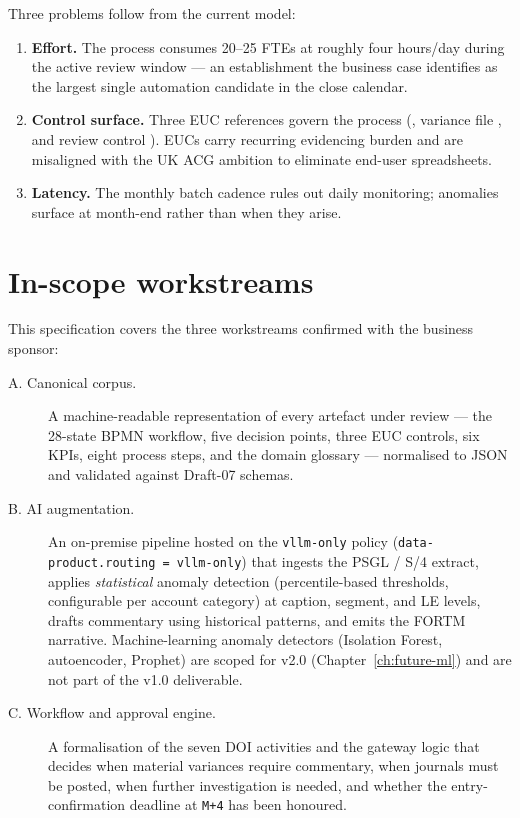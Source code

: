 \documentclass[11pt,a4paper,twoside]{report}
\begin{document}
Three problems follow from the current model:

\begin{enumerate}
\item \textbf{Effort.} The process consumes 20--25 FTEs at roughly
four hours/day during the active review window --- an
establishment the business case identifies as the largest
single automation candidate in the close calendar.
\item \textbf{Control surface.} Three EUC references govern the
process (, variance file
, and review control
). EUCs carry recurring
evidencing burden and are misaligned with the UK ACG ambition
to eliminate end-user spreadsheets.
\item \textbf{Latency.} The monthly batch cadence rules out daily
monitoring; anomalies surface at month-end rather than when
they arise.
\end{enumerate}

\section{In-scope workstreams}

This specification covers the three workstreams confirmed with the
business sponsor:

\begin{description}
\item[A. Canonical corpus.] A machine-readable representation of
every artefact under review --- the 28-state BPMN workflow,
five decision points, three EUC controls, six KPIs, eight
process steps, and the domain glossary --- normalised to JSON
and validated against Draft-07 schemas.
\item[B. AI augmentation.] An on-premise pipeline hosted on the
\texttt{vllm-only} policy (\texttt{data-product.routing = vllm-only})
that ingests the PSGL / S/4 extract, applies
\emph{statistical} anomaly detection (percentile-based
thresholds, configurable per account category) at caption,
segment, and LE levels, drafts commentary using historical
patterns, and emits the FORTM narrative. Machine-learning
anomaly detectors (Isolation Forest, autoencoder, Prophet)
are scoped for v2.0 (Chapter~\ref{ch:future-ml}) and are
not part of the v1.0 deliverable.
\item[C. Workflow and approval engine.] A formalisation of the seven
DOI activities and the gateway logic that decides when
material variances require commentary, when journals must be
posted, when further investigation is needed, and whether the
entry-confirmation deadline at \texttt{M+4} has been honoured.
\end{description}
\end{document}
